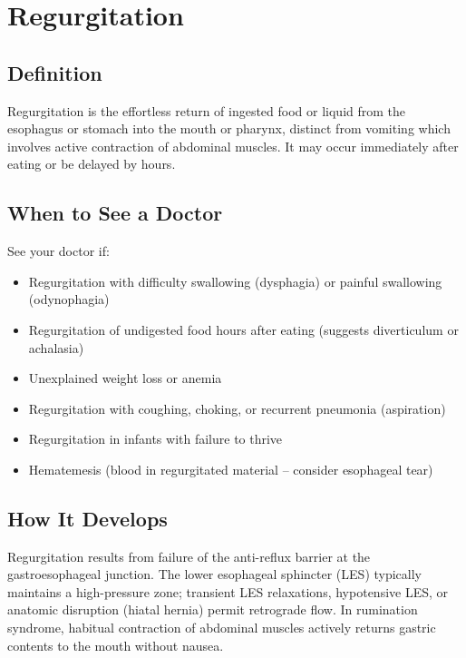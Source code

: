 \chapter{Regurgitation}

\section*{Definition}
Regurgitation is the effortless return of ingested food or liquid from the esophagus or stomach into the mouth or pharynx, distinct from vomiting which involves active contraction of abdominal muscles. It may occur immediately after eating or be delayed by hours.

\section*{When to See a Doctor}
See your doctor if:
\begin{itemize}
  \item Regurgitation with difficulty swallowing (dysphagia) or painful swallowing (odynophagia)
  \item Regurgitation of undigested food hours after eating (suggests diverticulum or achalasia)
  \item Unexplained weight loss or anemia
  \item Regurgitation with coughing, choking, or recurrent pneumonia (aspiration)
  \item Regurgitation in infants with failure to thrive
  \item Hematemesis (blood in regurgitated material -- consider esophageal tear)
\end{itemize}

\section*{How It Develops}
Regurgitation results from failure of the anti-reflux barrier at the gastroesophageal junction. The lower esophageal sphincter (LES) typically maintains a high-pressure zone; transient LES relaxations, hypotensive LES, or anatomic disruption (hiatal hernia) permit retrograde flow. In rumination syndrome, habitual contraction of abdominal muscles actively returns gastric contents to the mouth without nausea.

